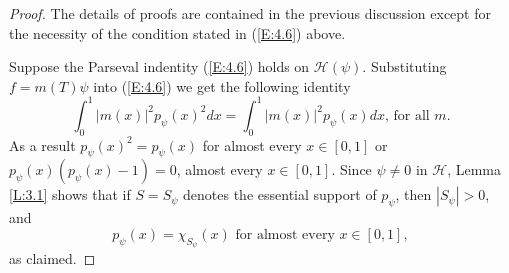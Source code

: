 \documentclass{birkmult}
\theoremstyle{definition}
\theoremstyle{remark}
\numberwithin{equation}{section}
\begin{document}
\begin{proof}
The details of proofs are contained in the previous discussion except for 
the necessity of the condition stated in (\ref{E:4.6}) above.

Suppose the Parseval indentity (\ref{E:4.6}) holds on $\mathcal{H}(\psi)$.  
Substituting $f = m(T)\psi$ into (\ref{E:4.6}) we get the following 
identity 
\[
  \int_{0}^{1}|m(x)|^{2}p_{\psi}(x)^{2}dx=\int_{0}^{1}|m(x)|^{2}p_{\psi}(x)dx
  \text{, for all } m.
\]
As a result $p_{\psi}(x)^{2}=p_{\psi}(x)$ for almost every $x \in [0,1]$ or
$p_{\psi}(x)(p_{\psi}(x)-1)=0$, almost every $x \in [0,1]$.
Since $\psi \neq 0$ in $\mathcal{H}$, Lemma \ref{L:3.1} shows that if 
$S = S_{\psi}$ denotes the essential support of $p_{\psi}$, then 
$|S_{\psi}| > 0$, and
\begin{equation}
\label{E:4.21}
  p_{\psi}(x)=\chi_{S_{\psi}}(x) \text{ for almost every } x \in [0,1],
\end{equation}
as claimed.
\end{proof}
\end{document}
